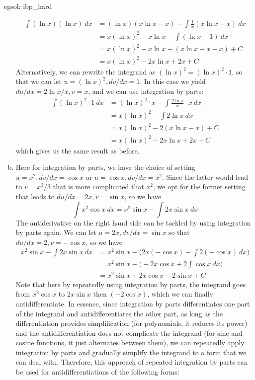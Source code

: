\begin{egsol}[]{egsol: ibp_hard}
\begin{enumerate}[a)]
        \begin{align*}
            \int (\ln x) (\ln x)~dx &= (\ln x)(x \ln x - x) - \int \frac{1}{x}(x \ln x - x)~dx\\
            &= x(\ln x)^2 - x \ln x - \int (\ln x - 1)~dx\\
            &= x(\ln x)^2 - x \ln x - (x \ln x - x - x) + C\\
            &= x(\ln x)^2 - 2x \ln x + 2x + C
        \end{align*}
        Alternatively, we can rewrite the integrand as $(\ln x)^2 = (\ln x)^2 \cdot 1$, so that we can let $u = (\ln x)^2, dv/dx = 1$.  In this case we yield $du/dx = 2 \ln x / x, v = x$, and we can use integration by parts:
        \begin{align*}
            \int (\ln x)^2 \cdot 1~dx &= (\ln x)^2 \cdot x - \int \frac{2\ln x}{x}\cdot x~dx\\
            &= x(\ln x)^2 - \int 2\ln x~dx\\
            &= x(\ln x)^2 - 2(x \ln x - x) + C\\
            &= x(\ln x)^2 - 2x \ln x + 2x + C
        \end{align*}
        which gives us the same result as before. 
        \item Here for integration by parts, we have the choice of setting $u = x^2, dv/dx = \cos x$ or $u = \cos x, dv/dx = x^2$.  Since the latter would lead to $v = x^3/3$ that is more complicated that $x^2$, we opt for the former setting that leads to $du/dx = 2x, v = \sin x$, so we have
        \[\int x^2 \cos x~dx = x^2 \sin x - \int 2x \sin x~dx\]
        The antiderivative on the right hand side can be tackled by using integration by parts again.  We can let $u = 2x, dv/dx = \sin x$ so that $du/dx = 2, v = -\cos x$, so we have 
        \begin{align*}
            x^2 \sin x - \int 2x \sin x~dx &= x^2 \sin x - \Big(2x(-\cos x) - \int 2 (-\cos x)~dx\Big)\\
            &= x^2 \sin x - \Big(-2x\cos x + 2\int \cos x~dx\Big)\\
            &= x^2 \sin x + 2x \cos x - 2\sin x + C
        \end{align*}
        Note that here by repeatedly using integration by parts, the integrand goes from $x^2\cos x$ to $2x\sin x$ then $(-2\cos x)$, which we can finally antidifferentiate.  In essence, since integration by parts differentiates one part of the integrand and antidifferentiates the other part, as long as the differentiation provides simplification (for polynomials, it reduces its power) and the antidifferentiation does not complicate the integrand (for sine and cosine functions, it just alternates between them), we can repeatedly apply integration by parts and gradually simplify the integrand to a form that we can deal with.  Therefore, this approach of repeated integration by parts can be used for antidifferentiations of the following forms:

\end{enumerate}
\end{egsol}

